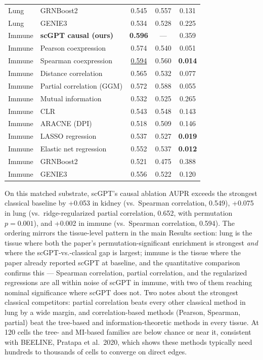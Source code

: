 \documentclass[11pt,letterpaper]{article}
\begin{document}
\begin{tabular}{llccc}
Lung   & GRNBoost2                        & 0.545 & 0.557 & 0.131 \\
Lung   & GENIE3                           & 0.534 & 0.528 & 0.225 \\
\midrule
Immune & \textbf{scGPT causal (ours)}     & \textbf{0.596} & ---   & 0.359 \\
Immune & Pearson coexpression             & 0.574 & 0.540 & 0.051 \\
Immune & Spearman coexpression            & \underline{0.594} & 0.560 & \textbf{0.014} \\
Immune & Distance correlation             & 0.565 & 0.532 & 0.077 \\
Immune & Partial correlation (GGM)        & 0.572 & 0.588 & 0.055 \\
Immune & Mutual information               & 0.532 & 0.525 & 0.265 \\
Immune & CLR                              & 0.543 & 0.548 & 0.143 \\
Immune & ARACNE (DPI)                     & 0.518 & 0.509 & 0.146 \\
Immune & LASSO regression                 & 0.537 & 0.527 & \textbf{0.019} \\
Immune & Elastic net regression           & 0.552 & 0.537 & \textbf{0.012} \\
Immune & GRNBoost2                        & 0.521 & 0.475 & 0.388 \\
Immune & GENIE3                           & 0.556 & 0.522 & 0.120 \\
\bottomrule
\end{tabular}
\medskip

On this matched substrate, scGPT's causal ablation AUPR exceeds the
strongest classical baseline by +0.053 in kidney (vs.\ Spearman
correlation, 0.549), +0.075 in lung (vs.\ ridge-regularized partial
correlation, 0.652, with permutation $p{=}0.001$), and +0.002 in immune
(vs.\ Spearman correlation, 0.594). The ordering mirrors the tissue-level
pattern in the main Results section: lung is the tissue where both the
paper's permutation-significant enrichment is strongest \emph{and} where
the scGPT-vs.-classical gap is largest; immune is the tissue where the
paper already reported scGPT at baseline, and the quantitative comparison
confirms this --- Spearman correlation, partial correlation, and the
regularized regressions are all within noise of scGPT in immune, with two
of them reaching nominal significance where scGPT does not. Two notes
about the strongest classical competitors: partial correlation beats every
other classical method in lung by a wide margin, and correlation-based
methods (Pearson, Spearman, partial) beat the tree-based and
information-theoretic methods in every tissue. At 120 cells the tree- and
MI-based families are below chance or near it, consistent with BEELINE,
Pratapa et al.\ 2020, which shows these methods typically need hundreds
to thousands of cells to converge on direct edges.
\end{document}
